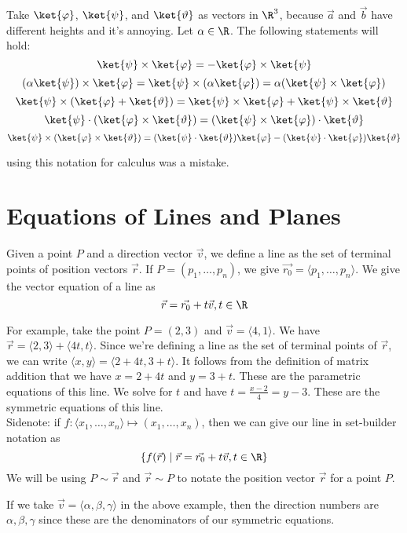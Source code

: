\begin{theorem}\label{thm:2}
	Take $\ket{\varphi}$, $\ket{\psi}$, and $\ket{\vartheta}$ as vectors in $\R^3$, because $\vec{a}$ and $\vec{b}$ have different heights and it's annoying. Let $\alpha\in\R$. The following statements will hold:
	$$\ket{\psi}\times\ket{\varphi}=-\ket{\varphi}\times\ket{\psi}$$
	$$(\alpha\ket{\psi})\times\ket{\varphi}=\ket{\psi}\times(\alpha\ket{\varphi})=\alpha(\ket{\psi}\times\ket{\varphi})$$
	$$\ket{\psi}\times(\ket{\varphi}+\ket{\vartheta})=\ket{\psi}\times\ket{\varphi}+\ket{\psi}\times\ket{\vartheta}$$
	$$\ket{\psi}\cdot(\ket{\varphi}\times\ket{\vartheta})=(\ket{\psi}\times\ket{\varphi})\cdot\ket{\vartheta}$$
	$$\ket{\psi}\times(\ket{\varphi}\times\ket{\vartheta})=(\ket{\psi}\cdot\ket{\vartheta})\ket{\varphi}-(\ket{\psi}\cdot\ket{\varphi})\ket{\vartheta}$$
\end{theorem}
\begin{remark}
	using this notation for calculus was a mistake.
\end{remark}
\section{Equations of Lines and Planes}
\begin{theorem}\label{thm:3}
	Given a point $P$ and a direction vector $\vec{v}$, we define a line as the set of terminal points of position vectors $\vec{r}$. If $P=(p_1,\ldots,p_n)$, we give $\vec{r_0}=\langle p_1,\ldots,p_n\rangle$. We give the vector equation of a line as
	$$\vec{r}=\vec{r_0}+t\vec{v},t\in\R$$
\end{theorem}
For example, take the point $P=(2,3)$ and $\vec{v}=\langle4,1\rangle$. We have $\vec{r}=\langle2,3\rangle+\langle4t,t\rangle$. Since we're defining a line as the set of terminal points of $\vec{r}$, we can write $\langle x,y\rangle=\langle2+4t,3+t\rangle$. It follows from the definition of matrix addition that we have $x=2+4t$ and $y=3+t$. These are the parametric equations of this line. We solve for $t$ and have $t=\frac{x-2}{4}=y-3$. These are the symmetric equations of this line.\\
Sidenote: if $f:\langle x_1,\ldots,x_n\rangle\mapsto(x_1,\ldots,x_n)$, then we can give our line in set-builder notation as
$$\{f(\vec{r})\mid\vec{r}=\vec{r_0}+t\vec{v},t\in\R\}$$
We will be using $P\sim\vec{r}$ and $\vec{r}\sim P$ to notate the position vector $\vec{r}$ for a point $P$.
\begin{definition}\label{def:2}
	If we take $\vec{v}=\langle\alpha,\beta,\gamma\rangle$ in the above example, then the direction numbers are $\alpha,\beta,\gamma$ since these are the denominators of our symmetric equations.
\end{definition}